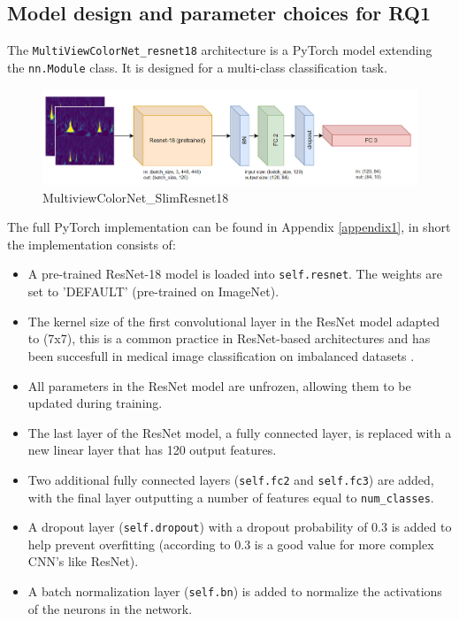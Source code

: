 \subsection{Model design and parameter choices for RQ1}
\label{model_RQ1}
The \verb|MultiViewColorNet_resnet18| architecture is a PyTorch model extending the \newline \verb|nn.Module| class. It is designed for a multi-class classification task. 
\begin{figure}[H]
    \centering
    \includegraphics[width=1.0\textwidth]{Images/SlimResnet18_Multiview_CL.png}
    \caption{MultiviewColorNet\_SlimResnet18}
    \label{fig:slimresnet18_multiview}
\end{figure}
The full PyTorch implementation can be found in Appendix \ref{appendix1}, in short the implementation consists of:
\begin{itemize}
    \item A pre-trained ResNet-18 model is loaded into \verb|self.resnet|. The weights are set to 'DEFAULT' (pre-trained on ImageNet). 
    \item The kernel size of the first convolutional layer in the ResNet model adapted to (7x7), this is a common practice in ResNet-based architectures \citep{tomen2021spectral} and has been succesfull in medical image classification on imbalanced datasets \citep{mursalim2021multi}.
    \item All parameters in the ResNet model are unfrozen, allowing them to be updated during training. 
    \item The last layer of the ResNet model, a fully connected layer, is replaced with a new linear layer that has 120 output features. 
    \item Two additional fully connected layers (\verb|self.fc2| and \verb|self.fc3|) are added, with the final layer outputting a number of features equal to \verb|num_classes|.
    \item A dropout layer (\verb|self.dropout|) with a dropout probability of 0.3 is added to help prevent overfitting (according to \citep{park2017analysis} 0.3 is a good value for more complex CNN's like ResNet). 
    \item A batch normalization layer (\verb|self.bn|) is added to normalize the activations of the neurons in the network. 
\end{itemize}

